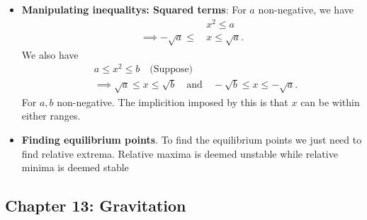 \documentclass{report}
\begin{document}
\begin{itemize}
    \item \textbf{Manipulating inequalitys: Squared terms}: For $a$ non-negative, we have
        \begin{align*}
            &x^{2} \leq a \\
            \implies -\sqrt{a} \leq\, &x \leq \sqrt{a}
        .\end{align*}
        \bigbreak \noindent 
        We also have
        \begin{align*}
           &a \leq x^{2} \leq b \quad \text{(Suppose)} \\
           &\implies \sqrt{a} \leq x \leq \sqrt{b} \quad \text{and} \quad -\sqrt{b} \leq x \leq -\sqrt{a}
        .\end{align*}
        \bigbreak \noindent 
        For $a,b$ non-negative. The implicition imposed by this is that $x$ can be within either ranges.

    \item \textbf{Finding equilibrium points}. To find the equilibrium points we just need to find relative extrema. Relative maxima is deemed unstable while relative minima is deemed stable

    \end{itemize}

    \pagebreak 
    \subsection{Chapter 13: Gravitation}
    \bigbreak \noindent 
\end{document}
